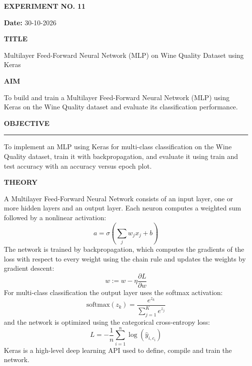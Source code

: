 \documentclass[11pt,twoside]{article}
\newcommand{\expheading}[1]{{\fontsize{14}{17}\selectfont\textbf{#1}\par}}
\newcommand{\fullrule}{\noindent\rule{\textwidth}{0.6pt}\par}
\begin{document}
{\makeatletter\let\vspace\@gobble\makeatother\fontsize{10}{11.4}\selectfont\setlength{\parskip}{0pt}\setlength{\abovedisplayskip}{0pt}\setlength{\belowdisplayskip}{0pt}
\begin{center}
\expheading{EXPERIMENT NO. 11}
\end{center}
\vspace{2pt}

\noindent\textbf{Date:} 30-10-2026\par
\vspace{6pt}

\expheading{TITLE}
\vspace{4pt}
\noindent Multilayer Feed-Forward Neural Network (MLP) on Wine Quality Dataset using Keras\par
\vspace{4pt}

\expheading{AIM}
\vspace{4pt}
\noindent To build and train a Multilayer Feed-Forward Neural Network (MLP) using Keras on the Wine Quality dataset and evaluate its classification performance. \par
\vspace{4pt}

\expheading{OBJECTIVE}
\vspace{2pt}
\fullrule
\vspace{4pt}
\noindent To implement an MLP using Keras for multi-class classification on the Wine Quality dataset, train it with backpropagation, and evaluate it using train and test accuracy with an accuracy versus epoch plot. \par
\vspace{4pt}

\expheading{THEORY}
\vspace{4pt}
A Multilayer Feed-Forward Neural Network consists of an input layer, one or more hidden layers and an output layer. Each neuron computes a weighted sum followed by a nonlinear activation:
\[a=\sigma\left(\sum_{j}w_jx_j+b\right)\]
The network is trained by backpropagation, which computes the gradients of the loss with respect to every weight using the chain rule and updates the weights by gradient descent:
\[w:=w-\eta\frac{\partial L}{\partial w}\]
For multi-class classification the output layer uses the softmax activation:
\[\text{softmax}(z_k)=\frac{e^{z_k}}{\sum_{j=1}^{K}e^{z_j}}\]
and the network is optimized using the categorical cross-entropy loss:
\[L=-\frac{1}{n}\sum_{i=1}^{n}\log\left(\hat{y}_{i,c_i}\right)\]
Keras is a high-level deep learning API used to define, compile and train the network.
\vspace{4pt}

}
\end{document}
